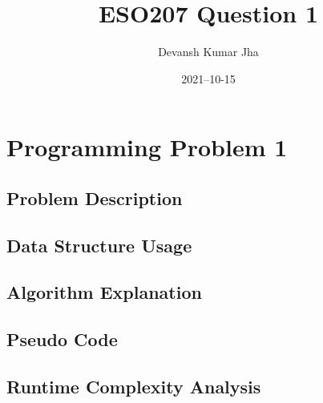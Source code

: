 \documentclass[20pt]{article}
\title{ESO207 Question 1}
\author{Devansh Kumar Jha}
\date{2021–10-15}
\begin{document}
\maketitle


\section{Programming Problem 1}

\subsection{Problem Description}

\subsection{Data Structure Usage}


\subsection{Algorithm Explanation}


\subsection{Pseudo Code}

\subsection{Runtime Complexity Analysis}
\end{document}
